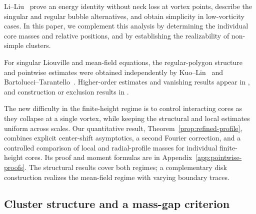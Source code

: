 \documentclass[11pt,reqno]{amsart}
\numberwithin{equation}{section}
\theoremstyle{definition}
\theoremstyle{remark}
\begin{document}
Li--Liu~\cite[Theorems~1.2 and~1.3]{LiLiu} prove an energy identity
without neck loss at vortex points, describe the singular and regular
bubble alternatives, and obtain simplicity in low-vorticity cases. In
this paper, we complement this analysis by determining the individual
core masses and relative positions, and by establishing the
realizability of non-simple clusters.

For singular Liouville and mean-field equations, the regular-polygon
structure and pointwise estimates were obtained independently by
Kuo--Lin~\cite{KuoLin} and Bartolucci--Tarantello~\cite[Theorem~1.4
and Section~6]{BartolucciTarantello}. Higher-order estimates and
vanishing results appear in
\cite{WeiZhang,WeiZhangVanishing,WeiZhangLaplacian,DAprileWeiZhangTAMS},
and construction or exclusion results in
\cite{DAprileWeiZhangDCDS,DAprileWeiZhangCVPDE,DAprileWeiZhangAJM}. 

The new difficulty in the finite-height regime is to control
interacting cores as they collapse at a single vortex, while keeping
the structural and local estimates uniform across scales.  Our quantitative result, Theorem~\ref{prop:refined-profile}, combines
explicit center-shift asymptotics, a second Fourier correction, and
a controlled comparison of local and radial-profile masses for
individual finite-height cores. Its proof and moment formulas are
in Appendix~\ref{app:pointwise-proofs}. The structural results cover
both regimes; a complementary disk construction realizes the
mean-field regime with varying boundary traces.

\subsection{Cluster structure and a mass-gap criterion}
\end{document}
